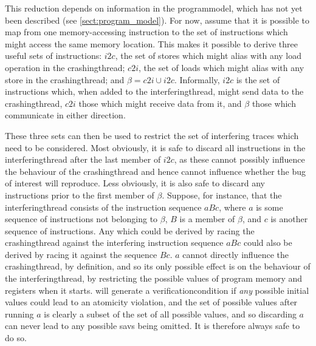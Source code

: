 This reduction depends on information in the \gls{programmodel}, which
has not yet been described (see \autoref{sect:program_model}).  For
now, assume that it is possible to map from one memory-accessing
instruction to the set of instructions which might access the same
memory location.  This makes it possible to derive three useful sets
of instructions: $i2c$, the set of stores which might alias with any
load operation in the \gls{crashingthread}; $c2i$, the set of loads
which might alias with any store in the \gls{crashingthread}; and
$\beta = c2i \cup i2c$.  Informally, $i2c$ is the set of instructions
which, when added to the \gls{interferingthread}, might send data to
the \gls{crashingthread}, $c2i$ those which might receive data from
it, and $\beta$ those which communicate in either direction.

These three sets can then be used to restrict the set of interfering
traces which need to be considered.  Most obviously, it is safe to
discard all instructions in the \gls{interferingthread} after the last
member of $i2c$, as these cannot possibly influence the behaviour of
the \gls{crashingthread} and hence cannot influence whether the bug of
interest will reproduce.  Less obviously, it is also safe to discard
any instructions prior to the first member of $\beta$.  Suppose, for
instance, that the \gls{interferingthread} consists of the instruction
sequence $aBc$, where $a$ is some sequence of instructions not
belonging to $\beta$, $B$ is a member of $\beta$, and $c$ is another
sequence of instructions.  Any  which could be
derived by racing the \gls{crashingthread} {\StateMachine} against the
interfering instruction sequence $aBc$ could also be derived by racing
it against the sequence $Bc$.  $a$ cannot directly influence the
\gls{crashingthread}, by definition, and so its only possible effect
is on the behaviour of the \gls{interferingthread}, by restricting the
possible values of program memory and registers when it starts.
{\Technique} will generate a \gls{verificationcondition} if \emph{any}
possible initial values could lead to an atomicity violation, and the
set of possible values after running $a$ is clearly a subset of the
set of all possible values, and so discarding $a$ can never lead to
any possible \glspl{sav} being omitted.  It is therefore always safe
to do so.

